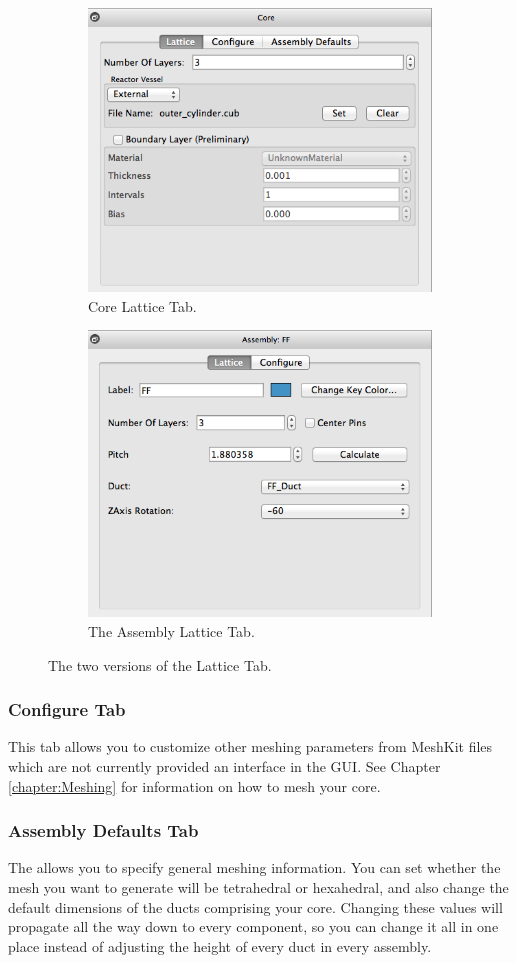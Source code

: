 \begin{figure}
\centering
\begin{subfigure}{.5\textwidth}
  \centering
  \includegraphics[width=0.6\linewidth]{Images/core-lattice.png}
  \caption{Core Lattice Tab.}
  \label{fig:rectSetMaterial}
\end{subfigure}%
\begin{subfigure}{.5\textwidth}
  \centering
  \includegraphics[width=0.6\linewidth]{Images/assy-lattice.png}
  \caption{The Assembly Lattice Tab.}
  \label{fig:rectDuctResult}
\end{subfigure}
\caption{The two versions of the Lattice Tab.}
\label{fig:latticetab}
\end{figure}


\subsubsection{Configure Tab}
This tab allows you to customize other meshing parameters from MeshKit files which are not currently provided an interface in the GUI. See Chapter \ref{chapter:Meshing} for information on how to mesh your core.

\subsubsection{Assembly Defaults Tab}
The  allows you to specify general meshing information.  You can set whether the mesh you want to generate will be tetrahedral or hexahedral, and also change the default dimensions of the ducts comprising your core.  Changing these values will propagate all the way down to every component, so you can change it all in one place instead of adjusting the height of every duct in every assembly.

